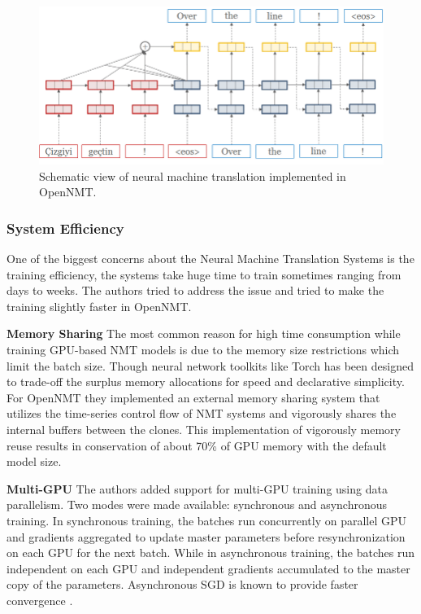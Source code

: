 \begin{figure}
\includegraphics[width=\textwidth]{figures/openmt.png}
\caption{ Schematic view of neural machine translation implemented in OpenNMT\citep{opennmt}.  } \label{fig1}
\end{figure}


\subsubsection{System Efficiency}

One of the biggest concerns about the Neural Machine Translation Systems is the training efficiency, the systems take huge time to train sometimes ranging from days to weeks. The authors tried to address the issue and tried to make the training slightly faster in OpenNMT. 

\textbf{Memory Sharing} The most common reason for high time consumption while training GPU-based NMT models is due to the memory size restrictions which limit the batch size. Though neural network toolkits like Torch has been designed to trade-off the surplus memory allocations for speed and declarative simplicity. For OpenNMT they implemented an external memory sharing system that utilizes the time-series control flow of NMT systems and vigorously shares the internal buffers between the clones. This implementation of vigorously memory reuse results in conservation of about 70\% of GPU memory with the default model size.

\textbf{Multi-GPU} The authors added support for multi-GPU training using data parallelism. Two modes were made available: synchronous and asynchronous training. In synchronous training, the batches run concurrently on parallel GPU and gradients aggregated to update master parameters before resynchronization on each GPU for the next batch. While in asynchronous training, the batches run independent on each GPU and independent gradients accumulated to the master copy of the parameters. Asynchronous SGD is known to provide faster convergence \citep{NIPS2012_4687}. 

